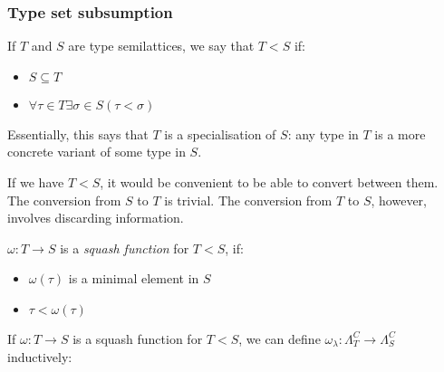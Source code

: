 \documentclass[main.tex]{subfiles}
\begin{document}
\subsubsection{Type set subsumption}
\begin{defn}
    If $T$ and $S$ are type semilattices, we say that $T \less S$ if:
    \begin{itemize}
        \item $S \subseteq T$
        \item $\forall \tau \in T \exists \sigma \in S ( \tau \less \sigma )$
    \end{itemize}

    Essentially, this says that $T$ is a specialisation of $S$: any type in
    $T$ is a more concrete variant of some type in $S$.
\end{defn}

If we have $T \less S$, it would be convenient to be able to convert between them.
The conversion from $S$ to $T$ is trivial. The conversion from $T$ to $S$,
however, involves discarding information.


\begin{defn}
    $\omega: T \rightarrow S$ is a \emph{squash function} for $T \less S$, if:
    \begin{itemize}
        \item $\omega(\tau)$ is a minimal element in $S$
        \item $\tau \less \omega(\tau)$
    \end{itemize}
\end{defn}

\begin{defn}
    If $\omega: T \rightarrow S$ is a squash function for $T \less S$, we can define
    $\omega_{\lambda}: \Lambda_T^C \rightarrow \Lambda_S^C$ inductively:
\end{defn}
\end{document}
